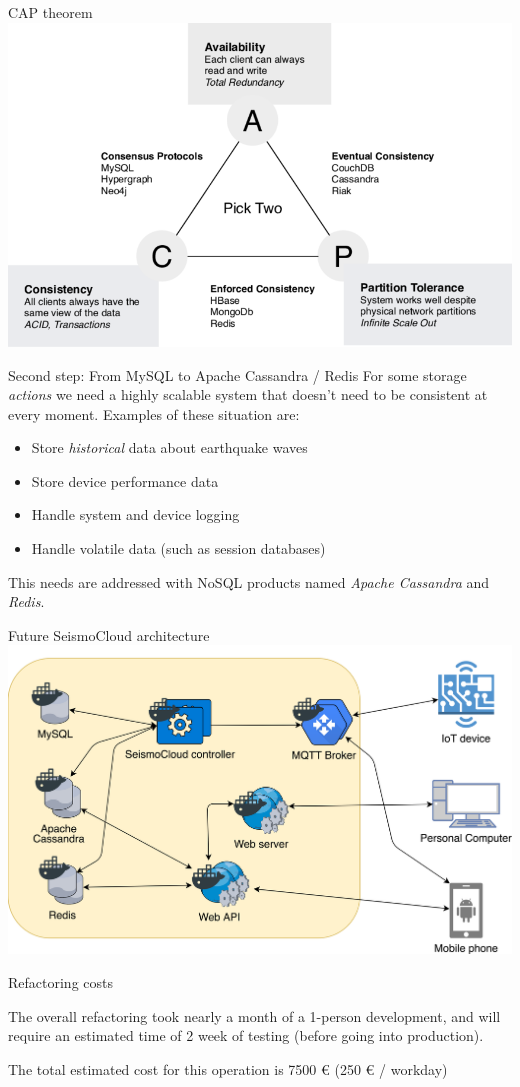 \begin{frame}{CAP theorem}
\centering
\includegraphics[keepaspectratio=true,width=\textwidth]{CAP-Theorem}
\end{frame}


\begin{frame}{Second step: From MySQL to Apache Cassandra / Redis}
For some storage \textit{actions} we need a highly scalable system that
doesn't need to be consistent at every moment. Examples of these situation are:

\begin{itemize}
  \item Store \textit{historical} data about earthquake waves
  \item Store device performance data
  \item Handle system and device logging
  \item Handle volatile data (such as session databases)
\end{itemize}

This needs are addressed with NoSQL products named \textit{Apache Cassandra} and
\textit{Redis}.
\end{frame}


\begin{frame}{Future SeismoCloud architecture}
\centering
\includegraphics[keepaspectratio=true,width=\textwidth]{scs-future-architecture}
\end{frame}


\begin{frame}{Refactoring costs}

	The overall refactoring took nearly a month of a 1-person development, and will
	require an estimated time of 2 week of testing (before going into production).

	\vspace{3em}

	The total estimated cost for this operation is 7500 € (250 € / workday)

\end{frame}
